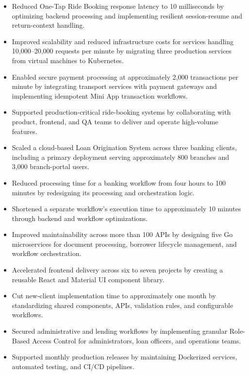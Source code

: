 \begin{itemize}
  \item Reduced One-Tap Ride Booking response latency to 10 milliseconds by optimizing backend processing and implementing resilient session-resume and return-context handling.
  \item Improved scalability and reduced infrastructure costs for services handling 10,000--20,000 requests per minute by migrating three production services from virtual machines to Kubernetes.
  \item Enabled secure payment processing at approximately 2,000 transactions per minute by integrating transport services with payment gateways and implementing idempotent Mini App transaction workflows.
  \item Supported production-critical ride-booking systems by collaborating with product, frontend, and QA teams to deliver and operate high-volume features.
\end{itemize}

\begin{itemize}
  \item Scaled a cloud-based Loan Origination System across three banking clients, including a primary deployment serving approximately 800 branches and 3,000 branch-portal users.
  \item Reduced processing time for a banking workflow from four hours to 100 minutes by redesigning its processing and orchestration logic.
  \item Shortened a separate workflow's execution time to approximately 10 minutes through backend and workflow optimizations.
  \item Improved maintainability across more than 100 APIs by designing five Go microservices for document processing, borrower lifecycle management, and workflow orchestration.
  \item Accelerated frontend delivery across six to seven projects by creating a reusable React and Material UI component library.
  \item Cut new-client implementation time to approximately one month by standardizing shared components, APIs, validation rules, and configurable workflows.
  \item Secured administrative and lending workflows by implementing granular Role-Based Access Control for administrators, loan officers, and operations teams.
  \item Supported monthly production releases by maintaining Dockerized services, automated testing, and CI/CD pipelines.
\end{itemize}
